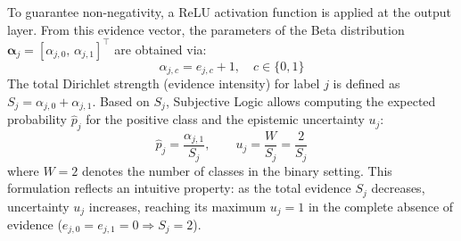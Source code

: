 \documentclass[conference]{IEEEtran}
\begin{document}
To guarantee non-negativity, a ReLU activation function is applied at the output layer. From this evidence vector, the parameters of the Beta distribution $\boldsymbol{\alpha}_j = [\alpha_{j,0},\, \alpha_{j,1}]^\top$ are obtained via:
\begin{equation}
    \alpha_{j,c} = e_{j,c} + 1, \quad c \in \{0, 1\}
    \label{eq:alpha}
\end{equation}
The total Dirichlet strength (evidence intensity) for label $j$ is defined as $S_j = \alpha_{j,0} + \alpha_{j,1}$. Based on $S_j$, Subjective Logic allows computing the expected probability $\hat{p}_j$ for the positive class and the epistemic uncertainty $u_j$:
\begin{equation}
    \hat{p}_j = \frac{\alpha_{j,1}}{S_j}, \qquad u_j = \frac{W}{S_j} = \frac{2}{S_j}
    \label{eq:pu}
\end{equation}
where $W = 2$ denotes the number of classes in the binary setting. This formulation reflects an intuitive property: as the total evidence $S_j$ decreases, uncertainty $u_j$ increases, reaching its maximum $u_j = 1$ in the complete absence of evidence ($e_{j,0} = e_{j,1} = 0 \Rightarrow S_j = 2$).
\end{document}
